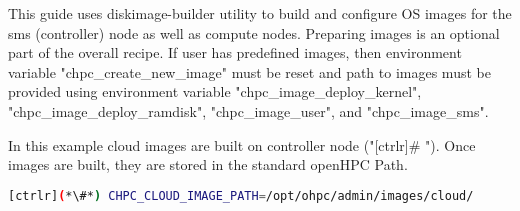

   This guide uses diskimage-builder utility to build and configure OS images 
for the sms (controller) node as well as compute nodes.  Preparing images is 
an optional part of the overall recipe. If user has predefined images, then 
environment variable "chpc\_create\_new\_image" must be reset and 
path to images must be provided using environment variable "chpc\_image\_deploy\_kernel", "chpc\_image\_deploy\_ramdisk",
"chpc\_image\_user", and "chpc\_image\_sms". 

In this example cloud images are built on controller node ("[ctrlr]\# "). Once images are built, they are stored in the standard openHPC Path.

\begin{lstlisting}[language=bash,keywords={},upquote=true]
[ctrlr](*\#*) CHPC_CLOUD_IMAGE_PATH=/opt/ohpc/admin/images/cloud/
\end{lstlisting}



